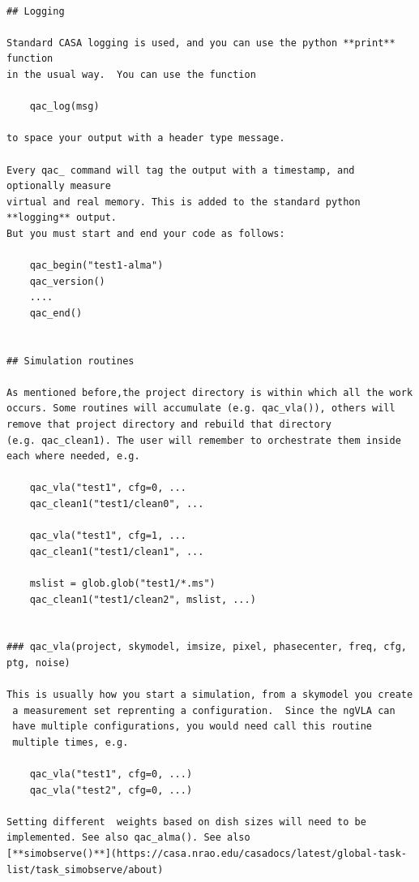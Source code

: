 \documentclass[11pt,twoside]{article}
\begin{document}
\footnotesize
\begin{verbatim}

## Logging

Standard CASA logging is used, and you can use the python **print** function
in the usual way.  You can use the function

    qac_log(msg)

to space your output with a header type message.

Every qac_ command will tag the output with a timestamp, and optionally measure
virtual and real memory. This is added to the standard python **logging** output.
But you must start and end your code as follows:

    qac_begin("test1-alma")
    qac_version()
    ....
    qac_end()


## Simulation routines

As mentioned before,the project directory is within which all the work
occurs. Some routines will accumulate (e.g. qac_vla()), others will
remove that project directory and rebuild that directory
(e.g. qac_clean1). The user will remember to orchestrate them inside
each where needed, e.g.

    qac_vla("test1", cfg=0, ...
    qac_clean1("test1/clean0", ...
    
    qac_vla("test1", cfg=1, ...
    qac_clean1("test1/clean1", ...

    mslist = glob.glob("test1/*.ms")
    qac_clean1("test1/clean2", mslist, ...)


### qac_vla(project, skymodel, imsize, pixel, phasecenter, freq, cfg, ptg, noise)

This is usually how you start a simulation, from a skymodel you create
 a measurement set reprenting a configuration.  Since the ngVLA can
 have multiple configurations, you would need call this routine
 multiple times, e.g.

    qac_vla("test1", cfg=0, ...)
    qac_vla("test2", cfg=0, ...)

Setting different  weights based on dish sizes will need to be implemented. See also qac_alma(). See also
[**simobserve()**](https://casa.nrao.edu/casadocs/latest/global-task-list/task_simobserve/about)


\end{verbatim}
\end{document}
